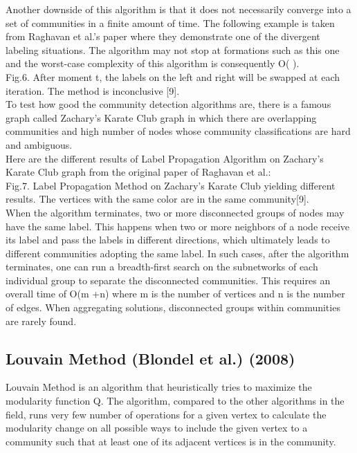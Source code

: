 \documentclass[10pt]{article}
\begin{document}
Another downside of this algorithm is that it does not necessarily converge into a set of communities in a finite amount of time. The following example is taken from Raghavan et al.’s paper where they demonstrate one of the divergent labeling situations. The algorithm may not stop at formations such as this one and the worst-case complexity of this algorithm is consequently O( ). \\

 Fig.6. After moment t, the labels on the left and right will be swapped at each iteration. The method is inconclusive [9]. \\
 
To test how good the community detection algorithms are, there is a famous graph called Zachary’s Karate Club graph in which there are overlapping communities and high number of nodes whose community classifications are hard and ambiguous. \\

Here are the different results of Label Propagation Algorithm on Zachary’s Karate Club graph from the original paper of Raghavan et al.: \\

  Fig.7. Label Propagation Method on Zachary’s Karate Club yielding different results. The vertices with the same color are in the same community[9]. \\
  
When the algorithm terminates, two or more disconnected groups of nodes may have the same label. This happens when two or more neighbors of a node receive its label and pass the labels in different directions, which ultimately leads to different communities adopting the same label. In such cases, after the algorithm terminates, one can run a breadth-first search on the subnetworks of each individual group to separate the disconnected communities. This requires an overall time of O(m +n) where m is the number of vertices and n is the number of edges. When aggregating solutions, disconnected groups within communities are rarely found. \\

\subsection{Louvain Method (Blondel et al.) (2008)} 

Louvain Method is an algorithm that heuristically tries to maximize the modularity function Q. The algorithm, compared to the other algorithms in the field, runs very few number of operations for a given vertex to calculate the modularity change on all possible ways to include the given vertex to a community such that at least one of its adjacent vertices is in the community. \\
\end{document}
